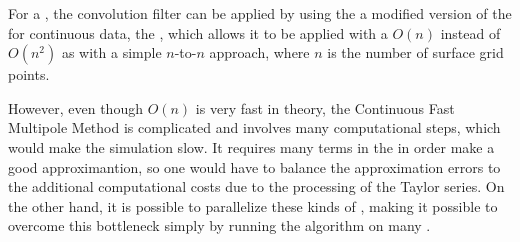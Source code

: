 For a , the convolution filter can be applied by using the a modified version of the \FMM \citep{Greengard1985,Greengard1987} for continuous data, the \CFMM \citep{White1994}, which allows it to be applied with a $O(n)$   instead of $O(n^2)$ as with a simple $n$-to-$n$ approach, where $n$ is the number of surface grid points.

However, even though $O(n)$ is very fast in theory, the Continuous Fast Multipole Method is complicated and involves many computational steps, which would make the simulation slow. It requires many terms in the  in order make a good approximantion, so one would have to balance the approximation errors to the additional computational costs due to the processing of the Taylor series. On the other hand, it is possible to parallelize these kinds of  \citep[see e.g.][]{Board1994}, making it possible to overcome this bottleneck simply by running the algorithm on many .
